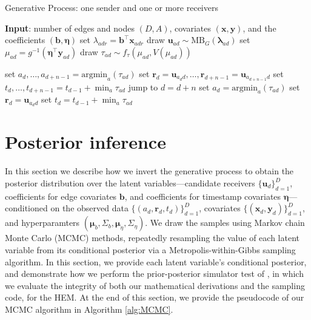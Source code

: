 \documentclass[ba]{imsart}
\def\spacingset#1{\renewcommand{\baselinestretch}%
	{#1}\small\normalsize} \spacingset{1}
\numberwithin{equation}{section}
\theoremstyle{plain}
\begin{document}
	\begin{algorithm}[!t]
		\spacingset{1}
		\SetAlgoLined
		\caption{Generative Process: one sender and one or more receivers}
		\begin{algorithmic}
			\STATE \textbf{Input}: number of edges and nodes $(D, A)$, covariates $(\boldsymbol{x}, \boldsymbol{y})$, and the coefficients $(\boldsymbol{b}, \boldsymbol{\eta})$
			\vskip 0.1in
			\STATE	set $\lambda_{adr} = {\boldsymbol{b}}^{\top}\boldsymbol{x}_{adr}$
			\ENDFOR
			\STATE	draw $\boldsymbol{u}_{ad}  \sim
			\mbox{MB}_G(\boldsymbol{\lambda}_{ad})$
			\STATE		set $\mu_{ad} = g^{-1}(\boldsymbol{\eta}^\top \boldsymbol{y}_{ad})$
			\STATE		draw $\tau_{ad} \sim f_\tau(\mu_{ad}, V(\mu_{ad}))$
			\ENDFOR
			
			\STATE	set $a_d, \ldots, a_{d+n-1}= \mbox{argmin}_{a}(\tau_{ad})$
			\STATE	set $\boldsymbol{r}_d=\boldsymbol{u}_{a_d d},\ldots,\boldsymbol{r}_{d+n-1}=\boldsymbol{u}_{a_{d+n-1} d}$
			\STATE	set $t_d, \ldots, t_{d+n-1}=t_{d-1} + \min_a\tau_{ad}$
			\STATE		jump to $d = d+n$
			\ELSE
			\STATE	set $a_d= \mbox{argmin}_{a}(\tau_{ad})$
			\STATE		set $\boldsymbol{r}_d = \boldsymbol{u}_{a_d d}$
			\STATE	set $t_d =t_{d-1} + \min_a\tau_{ad}$
			\ENDIF
			\ENDFOR
		\end{algorithmic}
		\label{alg:generative}
	\end{algorithm}
	
	\section{Posterior inference}\label{sec:inference}
	In this section we describe how we invert the generative process to obtain the posterior distribution over the latent variables---candidate receivers $\{\boldsymbol{u}_d\}_{d=1}^D$, coefficients for edge covariates $\boldsymbol{b}$, and coefficients for timestamp covariates $\boldsymbol{\eta}$---conditioned on the observed data $\{(a_d, \boldsymbol{r}_d, t_d)\}_{d=1}^D$, covariates $\{(\boldsymbol{x}_d, \boldsymbol{y}_d)\}_{d=1}^D$, and hyperparamters $(\boldsymbol{\mu}_b, \Sigma_b, \boldsymbol{\mu}_\eta, \Sigma_\eta)$. We draw the samples using Markov chain Monte Carlo (MCMC) methods, repeatedly resampling the value of each latent variable from its conditional posterior via a Metropolis-within-Gibbs sampling algorithm. In this section, we provide each latent variable's conditional posterior, and demonstrate how we perform the prior-posterior simulator test of \cite{geweke2004getting}, in which we evaluate the integrity of both our mathematical derivations and the sampling code, for the HEM. At the end of this section, we provide the pseudocode of our MCMC algorithm in Algorithm \ref{alg:MCMC}.
	
\end{document}
